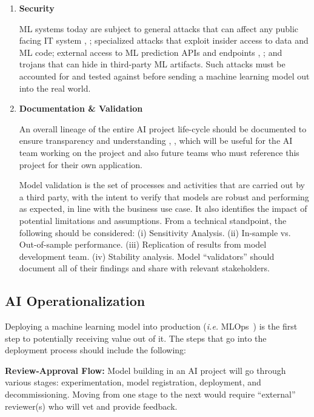 \documentclass{article}
\begin{document}
\begin{enumerate}
\item \textbf{Security}
 
\smallskip ML systems today are subject to general attacks that can affect any public facing IT system \cite{security_of_ml}, \cite {papernot2018marauder}; specialized attacks that exploit insider access to data and ML code; external access to ML prediction APIs and endpoints \cite{model_stealing}, \cite{membership_inference}; and trojans that can hide in third-party ML artifacts. Such attacks must be accounted for and tested against before sending a machine learning model out into the real world.

\item \textbf{Documentation \& Validation}

\smallskip An overall lineage of the entire AI project life-cycle should be documented to ensure transparency and understanding \cite{Mitchell_2019}, \cite{data_cards}, which will be useful for the AI team working on the project and also future teams who must reference this project for their own application.

\smallskip Model validation \cite{sr117, landry1983model} is the set of processes and activities that are carried out by a third party, with the intent to verify that models are robust and performing as expected, in line with the business use case. 
It also identifies the impact of potential limitations and assumptions. From a technical standpoint, the following should be considered: (i) Sensitivity Analysis. (ii) In-sample vs. Out-of-sample performance. (iii) Replication of results from model development team. (iv) Stability analysis. Model ``validators'' should document all of their findings and share with relevant stakeholders.

\end{enumerate}

\subsection{AI Operationalization}

Deploying a machine learning model into production (\emph{i.e.} MLOps~\cite{alla2021mlops, treveil2020introducing}) is the first step to potentially receiving value out of it. The steps that go into the deployment process should include the following: 

\textbf{Review-Approval Flow:} Model building in an AI project will go through various stages: experimentation, model registration, deployment, and decommissioning. Moving from one stage to the next would require ``external'' reviewer(s) who will vet and provide feedback.
\end{document}
